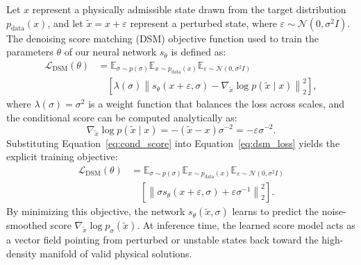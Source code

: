 \documentclass[letterpaper]{article} %
\def\Eqref#1{Equation~\ref{#1}}
\providecommand{\Eqref}[1]{\Cref{#1}}
\begin{document}
Let $x$ represent a physically admissible state drawn from the target distribution $p_{\mathrm{data}}(x)$, and let $\tilde{x} = x + \varepsilon$ represent a perturbed state, where $\varepsilon \sim \mathcal{N}(0, \sigma^2 I)$. The denoising score matching (DSM) objective function used to train the parameters $\theta$ of our neural network $s_\theta$ is defined as:
\begin{equation}
\begin{split}
\mathcal{L}_{\mathrm{DSM}}(\theta) &= \mathbb{E}_{\sigma \sim p(\sigma)} \mathbb{E}_{x \sim p_{\mathrm{data}}(x)} \mathbb{E}_{\varepsilon \sim \mathcal{N}(0, \sigma^2 I)} \\
&\quad \left[ \lambda(\sigma) \left\| s_\theta(x + \varepsilon, \sigma) - \nabla_{\tilde{x}} \log p(\tilde{x} \mid x) \right\|_2^2 \right],
\end{split}
\label{eq:dsm_loss}
\end{equation}
where $\lambda(\sigma) = \sigma^2$ is a weight function that balances the loss across scales, and the conditional score can be computed analytically as:
\begin{equation}
\nabla_{\tilde{x}} \log p(\tilde{x} \mid x) = -{(\tilde{x} - x)}{\sigma^{-2}} = -{\varepsilon}{\sigma^{-2}}.
\label{eq:cond_score}
\end{equation}
Substituting \Eqref{eq:cond_score} into \Eqref{eq:dsm_loss} yields the explicit training objective:
\begin{equation}
\begin{split}
\mathcal{L}_{\mathrm{DSM}}(\theta) &= \mathbb{E}_{\sigma \sim p(\sigma)} \mathbb{E}_{x \sim p_{\mathrm{data}}(x)} \mathbb{E}_{\varepsilon \sim \mathcal{N}(0, \sigma^2 I)} \\
&\quad \left[ \left\| \sigma s_\theta(x + \varepsilon, \sigma) + {\varepsilon}{\sigma^{-1}} \right\|_2^2 \right].
\end{split}
\label{eq:dsm_loss_explicit}
\end{equation}
By minimizing this objective, the network $s_\theta(\tilde{x}, \sigma)$ learns to predict the noise-smoothed score \(\nabla_{\tilde{x}} \log p_\sigma(\tilde{x})\). At inference time, the learned score model acts as a vector field pointing from perturbed or unstable states back toward the high-density manifold of valid physical solutions.
\end{document}
